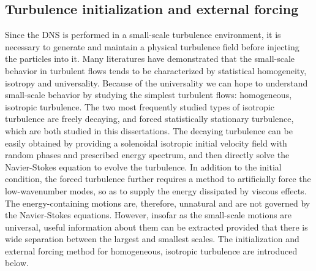 \subsection{Turbulence initialization and external forcing}
Since the DNS is performed in a small-scale turbulence environment, it is necessary to generate and maintain a physical turbulence field before injecting the particles into it. Many literatures \cite{} have demonstrated that the small-scale behavior in turbulent flows tends to be characterized by statistical homogeneity, isotropy and universality. Because of the universality we can hope to understand small-scale behavior by studying the simplest turbulent flows: homogeneous, isotropic turbulence. The two most frequently studied types of isotropic turbulence are freely decaying, and forced statistically stationary turbulence, which are both studied in this dissertations. The decaying turbulence can be easily obtained by providing a solenoidal isotropic initial velocity field with random phases and prescribed energy spectrum, and then directly solve the Navier-Stokes equation to evolve the turbulence. In addition to the initial condition, the forced turbulence further requires a method to artificially force the low-wavenumber modes, so as to supply the energy dissipated by viscous effects. The energy-containing motions are, therefore, unnatural and are not governed by the Navier-Stokes equations. However, insofar as the small-scale motions are universal, useful information about them can be extracted provided that there is wide separation between the largest and smallest scales. The initialization and external forcing method for homogeneous, isotropic turbulence are introduced below. 

